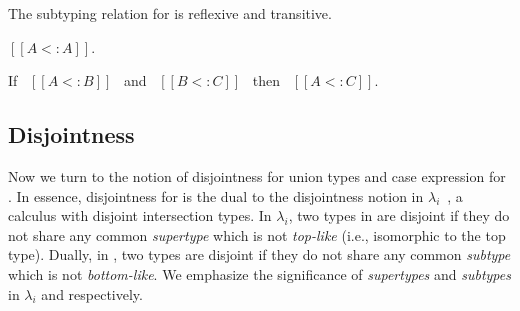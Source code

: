 The subtyping relation for \cal is reflexive and transitive.
\begin{lemma}
  $[[A <: A]]$.
\label{lemma:union:refl}
\end{lemma}
\begin{comment}
\begin{proof}
  By induction on type A. All cases are trivial to prove.
\end{proof}
\end{comment}
\begin{lemma}
  If \ $[[A <: B]]$ \ and \ $[[B <: C]]$ \ then \ $[[A <: C]]$.
  \label{lemma:union:trans}
\end{lemma}
\begin{comment}
\begin{proof}
  By induction on type B.
  \begin{itemize}
    \item Cases $[[Top]]$, $[[Bot]]$ and $[[Int]]$ are trivial to prove.
    \item Case $[[A -> B]]$ requires double induction on type $[[C]]$
          and $[[A]]$.
    \item Case $[[A \/ B]]$ requires \Cref{lemma:union:sub-or}
  \end{itemize}
\end{proof}\bruno{If space is a concern we can probably drop the lemma statements
for reflexivity and transitivity as these are quite standard.}

\begin{lemma}[Subtyping Union Inversion]
\label{lemma:union:sub-or}
  If \ $[[A \/ B <: C]]$ then:
  \begin{enumerate}
    \item $[[A <: C]]$ and
    \item $[[B <: C]]$
  \end{enumerate}
\end{lemma}
\end{comment}


\subsection{Disjointness}
\label{sec:union:disj}
Now we turn to the notion of disjointness for
union types and case expression for \cal. In essence, disjointness for \cal is
the dual to the disjointness notion in $\lambda_i$~\cite{oliveira2016disjoint},
a calculus with disjoint intersection types.
In $\lambda_i$, two
types in are disjoint if they do not share any common
\emph{supertype} which is not \emph{top-like} (i.e., isomorphic to the top type). Dually, in
\cal, two types are disjoint if they do not share any common \emph{subtype} which
is not \emph{bottom-like}.
We emphasize the significance of
\emph{supertypes} and \emph{subtypes} in $\lambda_i$ and \cal
respectively.

